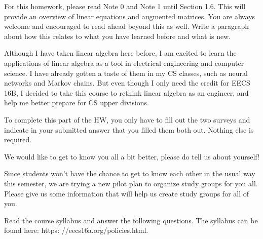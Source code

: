 \documentclass[11pt]{article}
\begin{document}
For this homework, please read Note 0 and Note 1 until Section 1.6. This will provide an overview of linear equations and augmented matrices. You are always welcome and encouraged to read ahead beyond this as well. Write a paragraph about how this relates to what you have learned before and what is new.
\begin{Answer}
	Although I have taken linear algebra here before, I am excited to learn the applications of linear algebra as a tool in electrical engineering and computer science. I have already gotten a taste of them in my CS classes, such as neural networks and Markov chains. But even though I only need the credit for EECS 16B, I decided to take this course to rethink linear algebra as an engineer, and help me better prepare for CS upper divisions.
\end{Answer}
	


To complete this part of the HW, you only have to fill out the two surveys and indicate in your
submitted answer that you filled them both out. Nothing else is required.

\begin{Parts}
	\Part We would like to get to know you all a bit better, please do tell us about yourself!
	
	\Part Since students won’t have the chance to get to know each other in the usual way this semester, we are trying a new pilot plan to organize study groups for you all. Please give us some information that will help us create study groups for all of you.
	
\end{Parts}


Read the course syllabus and answer the following questions. The syllabus can be found here: https: //eecs16a.org/policies.html.
\end{document}
